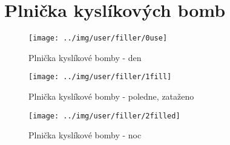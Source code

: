 
\section{Plnička kyslíkových bomb}



\begin{figure}[h!]\centering
\texttt{[image: ../img/user/filler/0use]}

\caption{Plnička kyslíkové bomby - den}
\label{fig:user_filler_0use}

\end{figure}

\begin{figure}[h!]\centering
\texttt{[image: ../img/user/filler/1fill]}

\caption{Plnička kyslíkové bomby - poledne, zataženo}
\label{fig:user_filler_1fill}

\end{figure}

\begin{figure}[h!]\centering
\texttt{[image: ../img/user/filler/2filled]}

\caption{Plnička kyslíkové bomby - noc}
\label{fig:user_filler_2filled}

\end{figure}

